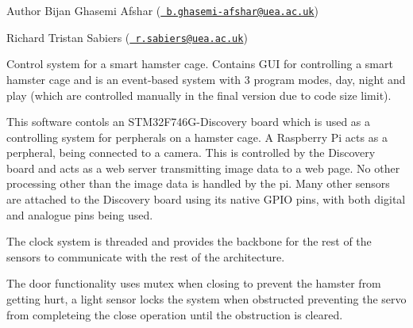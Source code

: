 \begin{DoxyAuthor}{Author}
Bijan Ghasemi Afshar (\href{mailto:b.ghasemi-afshar@uea.ac.uk}{\texttt{ b.\+ghasemi-\/afshar@uea.\+ac.\+uk}}) 

Richard Tristan Sabiers (\href{mailto:r.sabiers@uea.ac.uk}{\texttt{ r.\+sabiers@uea.\+ac.\+uk}})
\end{DoxyAuthor}
Control system for a smart hamster cage. Contains G\+UI for controlling a smart hamster cage and is an event-\/based system with 3 program modes, day, night and play (which are controlled manually in the final version due to code size limit).

This software contols an S\+T\+M32\+F746\+G-\/\+Discovery board which is used as a controlling system for perpherals on a hamster cage. A Raspberry Pi acts as a perpheral, being connected to a camera. This is controlled by the Discovery board and acts as a web server transmitting image data to a web page. No other processing other than the image data is handled by the pi. Many other sensors are attached to the Discovery board using its native G\+P\+IO pins, with both digital and analogue pins being used.

The clock system is threaded and provides the backbone for the rest of the sensors to communicate with the rest of the architecture.

The door functionality uses mutex when closing to prevent the hamster from getting hurt, a light sensor locks the system when obstructed preventing the servo from completeing the close operation until the obstruction is cleared. 